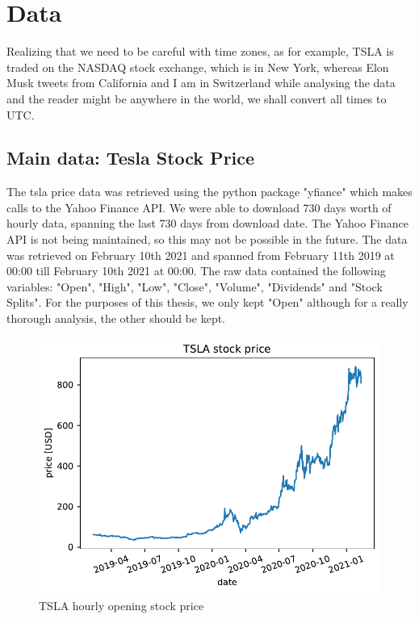 \chapter{Data}
Realizing that we need to be careful with time zones, as for example, TSLA is traded on the NASDAQ stock exchange, which is in New York, whereas Elon Musk tweets from California and I am in Switzerland while analysing the data and the reader might be anywhere in the world, we shall convert all times to UTC.
\section{Main data: Tesla Stock Price}
The \acrshort{tsla} price data was retrieved using the python package "yfiance" which makes calls to the Yahoo Finance \Gls{API}. We were able to download 730 days worth of hourly data, spanning the last 730 days from download date. The Yahoo Finance \Gls{API} is not being maintained, so this may not be possible in the future. The data was retrieved on February 10th 2021 and spanned from February 11th 2019 at 00:00 till February 10th 2021 at 00:00.
The raw data contained the following variables: "Open", "High", "Low", "Close", "Volume", "Dividends" and "Stock Splits".
For the purposes of this thesis, we only kept "Open" although for a really thorough analysis, the other should be kept.

\begin{figure}[h]
	\centering
	\includegraphics[width=\textwidth]{img/img_tsla.pdf}
	\caption{TSLA hourly opening stock price}
	\label{fig:tsla_open}
\end{figure}



